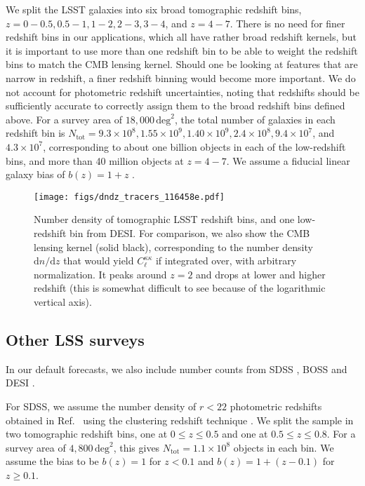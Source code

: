 \documentclass[prd,superscriptaddress,floatfix,notitlepage,nofootinbib,reprint]{revtex4-1} %
\begin{document}
We split the LSST galaxies into six broad tomographic redshift bins, $z=0-0.5, 0.5-1, 1-2, 2-3, 3-4$, and $z=4-7$.
There is no need for finer redshift bins in our applications, which all have rather broad redshift kernels, but it is important to use more than one redshift bin to be able to weight the redshift bins to match the CMB lensing kernel. Should one be looking at features that 
are narrow in redshift, a finer redshift binning would become more 
important. 
We do not account for photometric redshift uncertainties, noting that redshifts should be sufficiently accurate to correctly assign them to the broad redshift bins defined above.
For a survey area of $18,000\,\mathrm{deg}^2$, the total number of galaxies in each redshift bin is $N_\mathrm{tot}=9.3\times 10^8, 1.55\times 10^9, 1.40\times 10^9, 2.4\times 10^8, 9.4\times 10^7$, and $4.3\times 10^7$, corresponding to about one billion objects in each of the low-redshift bins, and more than 40 million objects at $z=4-7$. 
We assume a fiducial linear galaxy bias of $b(z)=1+z$ \cite{LSSTScienceBook}.



\begin{figure}[tbp]
\texttt{[image: figs/dndz\_tracers\_116458e.pdf]}
\caption{Number density of tomographic LSST redshift bins, and one low-redshift bin from DESI.
For comparison, we also show the CMB lensing kernel (solid black), corresponding to the number density $\mathrm{d}n/\mathrm{d}z$ that would yield $C_\ell^{\kappa\kappa}$ if integrated over, with arbitrary normalization. It peaks around $z= 2$ and drops at lower and higher redshift (this is somewhat difficult to see because of the logarithmic vertical axis).
}
\label{fig:dndz_z7}
\end{figure}



\subsection{Other LSS surveys}
In our default forecasts, we also include number counts from SDSS \cite{SDSSwebsite}, BOSS  \cite{BOSSwebsite} and DESI \cite{DESIwebsite}.

For SDSS, we assume the number density of $r<22$ photometric redshifts obtained in Ref.~\cite{Rahman1512} using the clustering redshift technique \cite{2008ApJ...684...88N,McQuinn:2013ib,Menard:2013aaa}. We split the sample in two tomographic redshift bins, one at $0\le z\le 0.5$ and one at $0.5\le z\le 0.8$.
For a survey area of $4,800\,\mathrm{deg}^2$, this gives $N_\mathrm{tot}=1.1\times 10^8$ objects in each bin.
We assume the bias to be $b(z)=1$ for $z<0.1$ and $b(z)=1+(z-0.1)$ for $z\ge 0.1$.
\end{document}
